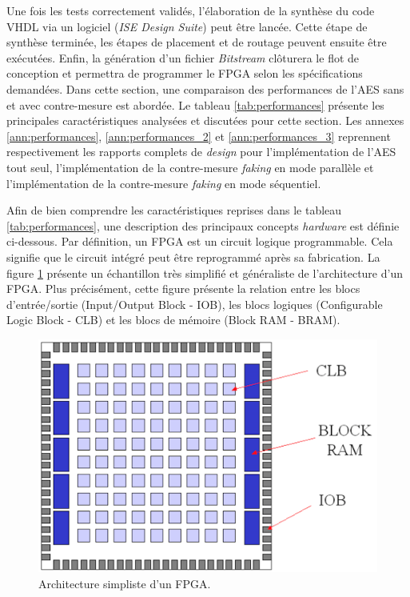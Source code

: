 \documentclass[oneside]{book}
\begin{document}
Une fois les tests correctement validés, l'élaboration de la synthèse du code VHDL via un logiciel (\textit{ISE Design Suite}) peut être lancée. Cette étape de synthèse terminée, les étapes de placement et de routage peuvent ensuite être exécutées. Enfin, la génération d'un fichier \textit{Bitstream} clôturera le flot de conception et permettra de programmer le FPGA selon les spécifications demandées. Dans cette section, une comparaison des performances de l'AES sans et avec contre-mesure est abordée. Le tableau \ref{tab:performances} présente les principales caractéristiques analysées et discutées pour cette section. Les annexes \ref{ann:performances}, \ref{ann:performances_2} et \ref{ann:performances_3} reprennent respectivement les rapports complets de \textit{design} pour l'implémentation de l'AES tout seul, l'implémentation de la contre-mesure \textit{faking} en mode parallèle et l'implémentation de la contre-mesure \textit{faking} en mode séquentiel.

Afin de bien comprendre les caractéristiques reprises dans le tableau \ref{tab:performances}, une description des principaux concepts \textit{hardware} est définie ci-dessous. Par définition, un FPGA est un circuit logique programmable. Cela signifie que le circuit intégré peut être reprogrammé après sa fabrication. La figure \ref{fig:general_archi_FPGA} présente un échantillon très simplifié et généraliste de l'architecture d'un FPGA. Plus précisément, cette figure présente la relation entre les blocs d'entrée/sortie (Input/Output Block - IOB), les blocs logiques (Configurable Logic Block - CLB) et les blocs de mémoire (Block RAM - BRAM).

\begin{figure}[htbp]
    \centering
    \includegraphics[scale=0.5]{image/general_archi_FPGA}
    \caption{Architecture simpliste d'un FPGA.}
    \label{fig:general_archi_FPGA} 
\end{figure}
\end{document}
